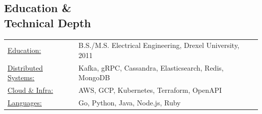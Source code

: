 \begin{resume}
\section{Education \& \\ Technical Depth}
   \begin{tabular}{l p{3.3in}}
    \underline{Education:} & B.S./M.S. Electrical Engineering, Drexel University, 2011 \\
    \underline{Distributed Systems:} & Kafka, gRPC, Cassandra, Elasticsearch, Redis, MongoDB \\
    \underline{Cloud \& Infra:} & AWS, GCP, Kubernetes, Terraform, OpenAPI \\
    \underline{Languages:} & Go, Python, Java, Node.js, Ruby
   \end{tabular}

\end{resume}
